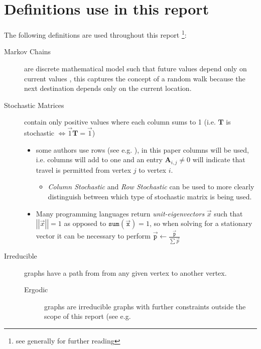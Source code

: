 \documentclass[11pt]{article}
\begin{document}
\section{Definitions use in this report}
\label{definitions}
The following definitions are used throughout this report \footnote{see generally \cite[Ch. 15]{langvilleGooglePageRankScience2012} for further reading}:

\begin{description}
\item[{Markov Chains}] are discrete mathematical model such that future values depend only on current values \cite[]{larsonElementaryLinearAlgebra1991}, this captures the concept of a random walk because the next destination depends only on the current location.
\item[{Stochastic Matrices}] contain only positive values where each column sums to 1 \cite{langvilleGooglePageRankScience2012,larsonElementaryLinearAlgebra1991} (i.e. \(\mathbf{T}\) is stochastic \(\iff \vec{1}\mathbf{T} = \vec{1}\))
\begin{itemize}
\item some authors use rows (see e.g. \cite[]{langvilleGooglePageRankScience2012}), in this paper columns will be used, i.e. columns will add to one and an entry \(\mathbf{A}_{i,j} \neq 0\) will indicate that travel is permitted from vertex \(j\) to vertex \(i\).
\begin{itemize}
\item \emph{Column Stochastic} and \emph{Row Stochastic} can be used to more clearly distinguish between which type of stochastic matrix is being used.
\end{itemize}
\item Many programming languages return \emph{unit-eigenvectors} \(\vec{x}\) such that \(\left\lvert \left\lvert \vec{x} \right\rvert \right\rvert = 1\) as opposed to \(\mathtt{sum} \left( \vec{\mathtt{x}}\right) = 1\), so when solving for a stationary vector it can be necessary to perform \(\vec{\mathtt{p}} \leftarrow \frac{\vec{\mathtt{p}}}{\sum \vec{p}}\)
\end{itemize}
\item[{Irreducible}] graphs have a path from from any given vertex to another vertex. \cite[]{langvilleGooglePageRankScience2012}
\begin{description}
\item[{Ergodic}] graphs are irreducible graphs with further constraints outside
the scope of this report (see e.g.

\end{description}
\end{description}
\end{document}
